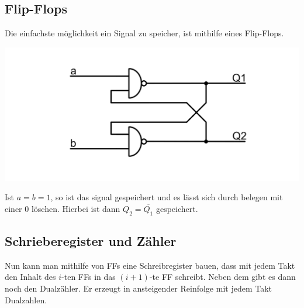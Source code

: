 \documentclass[10pt]{article}
\newenvironment{Figure}
  {\par\medskip\noindent\minipage{\linewidth}}
  {\endminipage\par\medskip}
\begin{document}
\begin{multicols}{2}
	\subsection{Flip-Flops}
	Die einfachste möglichkeit ein Signal zu speicher, ist mithilfe eines Flip-Flops.
	\begin{Figure}
		\centering
		\includegraphics[width=1\textwidth]{fliflop.png}
	\end{Figure}
	Ist $a=b=1$, so ist das signal gespeichert und es lässt sich durch belegen mit einer 0 löschen. Hierbei ist dann $Q_2=\overline{Q_1}$ gespeichert.
	\subsection{Schrieberegister und Zähler}
	Nun kann man mithilfe von FFs eine Schreibregister bauen, dass mit jedem Takt den Inhalt des $i$-ten FFs in das $(i+1)$-te FF schreibt. Neben dem gibt es dann noch den Dualzähler. Er erzeugt in ansteigender Reinfolge mit jedem Takt Dualzahlen.

\end{multicols}
\end{document}
